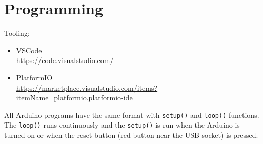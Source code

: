 \documentclass[a4paper, 11pt]{article}
\begin{document}
\section{Programming}

Tooling: 

\begin{itemize}
  \item VSCode \\
  \url{https://code.visualstudio.com/}
  \item PlatformIO \\
  \url{https://marketplace.visualstudio.com/items?itemName=platformio.platformio-ide}
\end{itemize}

All Arduino programs have the same format with \verb|setup()| and \verb|loop()| functions.
The \verb|loop()| runs continuously and the \verb|setup()| is run
when the Arduino is turned on
or
when the reset button (red button near the USB socket) is pressed.
\end{document}
